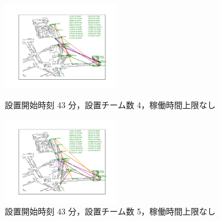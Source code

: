 \documentclass[a4paper,12pt,fleqn]{jarticle}
\begin{document}
\begin{figure}
 \begin{center}
  \begin{minipage}{0.49\hsize}
   \begin{center}
    \includegraphics[width=5cm,trim=100 50 100 50]{fig/43min_4team_nolim.pdf}
    \caption{設置開始時刻 43 分，\newline \quad 設置チーム数 4，稼働時間上限なし}
    \label{fig:43min_4team_nolim}
   \end{center}
  \end{minipage}
  \begin{minipage}{0.49\hsize}
   \begin{center}
    \includegraphics[width=5cm,trim=100 50 100 50]{fig/43min_5team_nolim.pdf}
    \caption{設置開始時刻 43 分，\newline \quad 設置チーム数 5，稼働時間上限なし}
    \label{fig:43min_5team_nolim}
   \end{center}
  \end{minipage}
 \end{center}
\end{figure}
\end{document}
